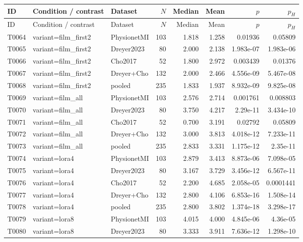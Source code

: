 \begin{longtable}{p{.45in}p{2.6in}p{.75in}rrrrr}
\toprule
ID & Condition / contrast & Dataset & $N$ & Median & Mean & $p$ & $p_H$ \\
\midrule
\endfirsthead
\toprule
ID & Condition / contrast & Dataset & $N$ & Median & Mean & $p$ & $p_H$ \\
\midrule
\endhead
T0064 & variant=film\_\allowbreak{}first2 & PhysionetMI & 103 & 1.818 & 1.258 & 0.01936 & 0.05809 \\
T0065 & variant=film\_\allowbreak{}first2 & Dreyer2023 & 80 & 2.000 & 2.138 & 1.983e-07 & 1.983e-06 \\
T0066 & variant=film\_\allowbreak{}first2 & Cho2017 & 52 & 1.800 & 2.972 & 0.003439 & 0.01376 \\
T0067 & variant=film\_\allowbreak{}first2 & Dreyer+Cho & 132 & 2.000 & 2.466 & 4.556e-09 & 5.467e-08 \\
T0068 & variant=film\_\allowbreak{}first2 & pooled & 235 & 1.833 & 1.937 & 8.932e-09 & 9.825e-08 \\
T0069 & variant=film\_\allowbreak{}all & PhysionetMI & 103 & 2.576 & 2.714 & 0.001761 & 0.008803 \\
T0070 & variant=film\_\allowbreak{}all & Dreyer2023 & 80 & 3.750 & 4.217 & 2.29e-11 & 3.434e-10 \\
T0071 & variant=film\_\allowbreak{}all & Cho2017 & 52 & 0.700 & 3.191 & 0.02792 & 0.05809 \\
T0072 & variant=film\_\allowbreak{}all & Dreyer+Cho & 132 & 3.000 & 3.813 & 4.018e-12 & 7.233e-11 \\
T0073 & variant=film\_\allowbreak{}all & pooled & 235 & 2.833 & 3.331 & 1.175e-12 & 2.35e-11 \\
T0074 & variant=lora4 & PhysionetMI & 103 & 2.879 & 3.413 & 8.873e-06 & 7.098e-05 \\
T0075 & variant=lora4 & Dreyer2023 & 80 & 3.167 & 3.729 & 3.456e-12 & 6.567e-11 \\
T0076 & variant=lora4 & Cho2017 & 52 & 2.200 & 4.685 & 2.058e-05 & 0.0001441 \\
T0077 & variant=lora4 & Dreyer+Cho & 132 & 2.800 & 4.106 & 6.853e-16 & 1.508e-14 \\
T0078 & variant=lora4 & pooled & 235 & 2.800 & 3.802 & 1.374e-18 & 3.298e-17 \\
T0079 & variant=lora8 & PhysionetMI & 103 & 4.015 & 4.000 & 4.845e-06 & 4.36e-05 \\
T0080 & variant=lora8 & Dreyer2023 & 80 & 3.333 & 3.911 & 7.636e-12 & 1.298e-10 \\

\end{longtable}
